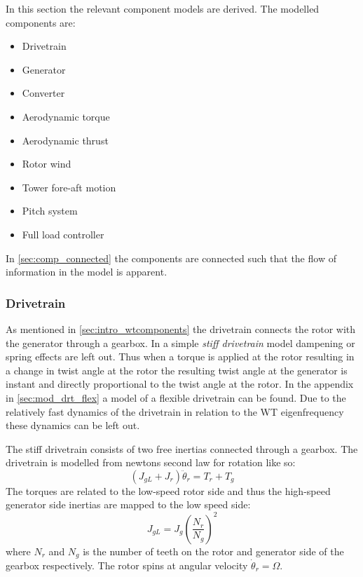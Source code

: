 \smallskip
\noindent In this section the relevant component models are derived. The modelled components are:
\begin{itemize}
	\item Drivetrain
	\item Generator
	\item Converter
	\item Aerodynamic torque
	\item Aerodynamic thrust
	\item Rotor wind
	\item Tower fore-aft motion
	\item Pitch system
	\item Full load controller
\end{itemize}
In \cref{sec:comp_connected} the components are connected such that the flow of information in the model is apparent. 


\subsubsection{Drivetrain} \label{sec:comp_drv}
As mentioned in \cref{sec:intro_wtcomponents} the drivetrain connects the rotor with the generator through a gearbox. In a simple \textit{stiff drivetrain} model dampening or spring effects are left out. Thus when a torque is applied at the rotor resulting in a change in twist angle at the rotor the resulting twist angle at the generator is instant and directly proportional to the twist angle at the rotor. In the appendix in \cref{sec:mod_drt_flex} a model of a flexible drivetrain can be found. Due to the relatively fast dynamics of the drivetrain in relation to the WT eigenfrequency these dynamics can be left out. 

The stiff drivetrain consists of two free inertias connected through a gearbox. The drivetrain is modelled from newtons second law for rotation like so:
\begin{equation}\label{eq:wtlin_comp_drivetrain}
	(J_{gL} + J_{r}) \ddot{\theta}_r = T_{r} + T_{g}
\end{equation}
The torques are related to the low-speed rotor side and thus the high-speed generator side inertias are mapped to the low speed side:
\begin{equation} \label{eq:wtlin_comp_inertiamap}
	J_{gL} = J_{g} \left(\dfrac{N_r}{N_g}\right)^2
\end{equation}
where $ N_r $ and $ N_g $ is the number of teeth on the rotor and generator side of the gearbox respectively. The rotor spins at angular velocity $ \dot{\theta}_r = \Omega $.

